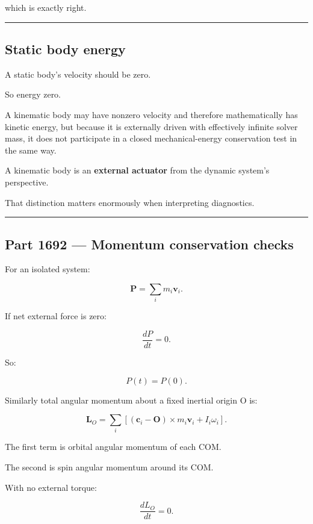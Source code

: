 which is exactly right.

\begin{center}\rule{0.5\linewidth}{0.5pt}\end{center}

\subsection{Static body energy}\label{06-engine-ii-ch039-static-body-energy}

A static body's velocity should be zero.

So energy zero.

A kinematic body may have nonzero velocity and therefore mathematically has kinetic energy, but because it is externally driven with effectively infinite solver mass, it does not participate in a closed mechanical-energy conservation test in the same way.

A kinematic body is an \textbf{external actuator} from the dynamic system's perspective.

That distinction matters enormously when interpreting diagnostics.

\begin{center}\rule{0.5\linewidth}{0.5pt}\end{center}

\subsection{Part 1692 --- Momentum conservation checks}\label{06-engine-ii-ch039-part-1692-momentum-conservation-checks}

For an isolated system:

\[
\boxed{
\mathbf P
=
\sum_i
m_i\mathbf v_i.
}
\]

If net external force is zero:

\[
\frac{dP}{dt}=0.
\]

So:

\[
P(t)=P(0).
\]

Similarly total angular momentum about a fixed inertial origin O is:

\[
\boxed{
\mathbf L_O
=
\sum_i
[
(\mathbf c_i-\mathbf O)\times m_i\mathbf v_i
+
I_i\omega_i
].
}
\]

The first term is orbital angular momentum of each COM.

The second is spin angular momentum around its COM.

With no external torque:

\[
\frac{dL_O}{dt}=0.
\]


